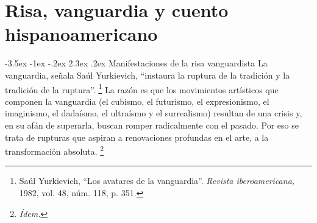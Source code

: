 \documentclass[14pt,twoside,final]{extbook} %
\makeatletter
\let\oldfootnote\footnote
\renewcommand\footnote[1]{%
\oldfootnote{\hspace{1mm}#1}}
\renewcommand\section{\@startsection {section}{1}{\z@}%
                                     {-3.5ex \@plus -1ex \@minus -.2ex}%
                                     {2.3ex \@plus .2ex}%
                                     {\normalfont\large\bfseries\sc}}
\makeatother
\begin{document}
\chapter[\textsc{Risa, vanguardia y cuento hispanoamericano}]{Risa, vanguardia y cuento hispanoamericano}\label{ch:risa-vanguardia-y-cuento-hispanoamericano}
\BgThispage
\thispagestyle{empty}
\pagestyle{fancy}
\fancyhf{} %
\fancyhead[RO,LE]{\thepage}
\renewcommand{\headrulewidth}{0pt}
\section{Manifestaciones de la risa vanguardista}\label{sec:manifestaciones-de-la-risa-vanguardista}
La vanguardia, señala Saúl Yurkievich, ``instaura la ruptura de la tradición y la tradición de la ruptura''.\footnote{Saúl Yurkievich, ``Los avatares de la vanguardia''. \emph{Revista iberoamericana,} 1982, vol. 48, núm. 118, p. 351.} La razón es que los movimientos artísticos que componen la vanguardia (el cubismo, el futurismo, el expresionismo, el imaginismo, el dadaísmo, el ultraísmo y el surrealismo) resultan de una crisis y, en su afán de superarla, buscan romper radicalmente con el pasado. Por eso se trata de rupturas que aspiran a renovaciones profundas en el arte, a la transformación absoluta.\footnote{\em Ídem.}
\end{document}
